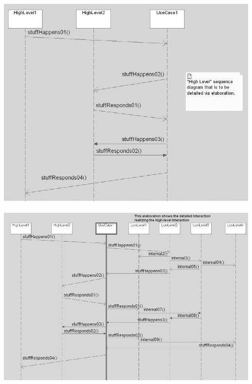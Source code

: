 \documentclass[12pt,a4paper]{article}
\begin{document}
\includegraphics[scale=0.5]{high_level_seq.png} \\\\
\includegraphics[scale=0.5]{elaborated_seq.png} \\\\\
\end{document}
